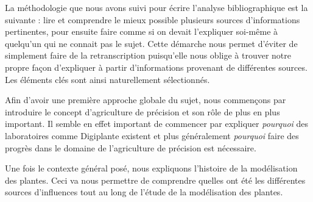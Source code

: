 

La méthodologie que nous avons suivi pour écrire l'analyse bibliographique
est la suivante : lire et comprendre le mieux possible plusieurs sources
d'informations pertinentes, pour ensuite faire comme si on devait l'expliquer 
soi-même à quelqu'un qui ne connait pas le sujet.
Cette démarche nous permet d'éviter de simplement faire de la retranscription
puisqu'elle nous oblige à trouver notre propre façon d'expliquer 
à partir d'informations provenant de différentes sources.
Les éléments clés sont ainsi naturellement sélectionnés.


Afin d'avoir une première approche globale du sujet, nous commençons par introduire
le concept d'agriculture de précision et son rôle de plus en plus important.
Il semble en effet important de commencer par expliquer \emph{pourquoi}
des laboratoires comme Digiplante existent et plus généralement \emph{pourquoi}
faire des progrès dans le domaine de l'agriculture de précision est nécessaire.

Une fois le contexte général posé, nous expliquons l'histoire de la modélisation 
des plantes. Ceci va nous permettre de comprendre quelles ont été les différentes 
sources d'influences tout au long de l'étude de la modélisation des plantes.
